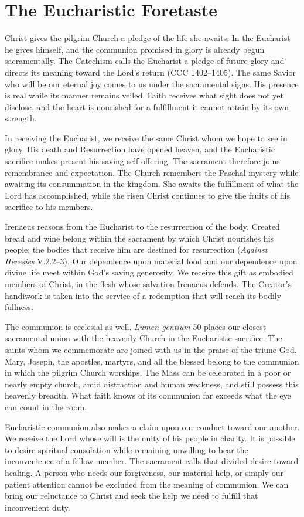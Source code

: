 \section{The Eucharistic Foretaste}

Christ gives the pilgrim Church a pledge of the life she awaits. In the Eucharist he gives himself, and the communion promised in glory is already begun sacramentally. The Catechism calls the Eucharist a pledge of future glory and directs its meaning toward the Lord's return (CCC 1402--1405). The same Savior who will be our eternal joy comes to us under the sacramental signs. His presence is real while its manner remains veiled. Faith receives what sight does not yet disclose, and the heart is nourished for a fulfillment it cannot attain by its own strength.

In receiving the Eucharist, we receive the same Christ whom we hope to see in glory. His death and Resurrection have opened heaven, and the Eucharistic sacrifice makes present his saving self-offering. The sacrament therefore joins remembrance and expectation. The Church remembers the Paschal mystery while awaiting its consummation in the kingdom. She awaits the fulfillment of what the Lord has accomplished, while the risen Christ continues to give the fruits of his sacrifice to his members.

Irenaeus reasons from the Eucharist to the resurrection of the body. Created bread and wine belong within the sacrament by which Christ nourishes his people; the bodies that receive him are destined for resurrection (\emph{Against Heresies} V.2.2--3). Our dependence upon material food and our dependence upon divine life meet within God's saving generosity. We receive this gift as embodied members of Christ, in the flesh whose salvation Irenaeus defends. The Creator's handiwork is taken into the service of a redemption that will reach its bodily fullness.

The communion is ecclesial as well. \emph{Lumen gentium} 50 places our closest sacramental union with the heavenly Church in the Eucharistic sacrifice. The saints whom we commemorate are joined with us in the praise of the triune God. Mary, Joseph, the apostles, martyrs, and all the blessed belong to the communion in which the pilgrim Church worships. The Mass can be celebrated in a poor or nearly empty church, amid distraction and human weakness, and still possess this heavenly breadth. What faith knows of its communion far exceeds what the eye can count in the room.

Eucharistic communion also makes a claim upon our conduct toward one another. We receive the Lord whose will is the unity of his people in charity. It is possible to desire spiritual consolation while remaining unwilling to bear the inconvenience of a fellow member. The sacrament calls that divided desire toward healing. A person who needs our forgiveness, our material help, or simply our patient attention cannot be excluded from the meaning of communion. We can bring our reluctance to Christ and seek the help we need to fulfill that inconvenient duty.

